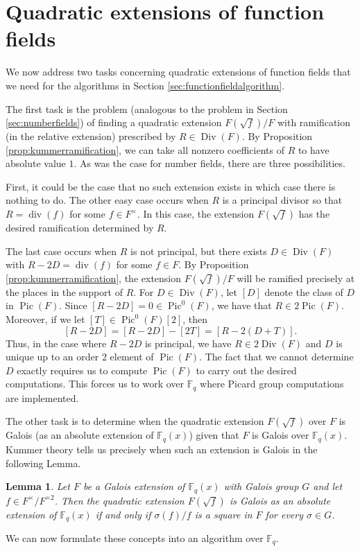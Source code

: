 \documentclass{dcthesis}
\newcommand{\FF}{\mathbb{F}}
\DeclareMathOperator{\Div}{Div}
\DeclareMathOperator{\Pic}{Pic}
\DeclareMathOperator{\ddiv}{div}
\numberwithin{equation}{section}
\newtheorem{lemma}[equation]{Lemma}
\theoremstyle{definition}
\theoremstyle{remark}
\begin{document}
{{  \section{Quadratic extensions of function fields}{
    \label{sec:functionfieldextensions}
    We now address two tasks concerning
    quadratic extensions of function fields
    that we need for the algorithms
    in Section \ref{sec:functionfieldalgorithm}.
    \par
    The first task is the problem
    (analogous to the problem in Section
    \ref{sec:numberfields})
    of
    finding a quadratic extension $F(\sqrt{f})/F$
    with ramification
    (in the relative extension)
    prescribed by
    $R\in\Div(F)$.
    By Proposition
    \ref{prop:kummerramification},
    we can take all nonzero coefficients
    of $R$ to have absolute value $1$.
    As was the case for number fields,
    there are three possibilities.
    \par
    First, it could be the case that no such
    extension exists in which case
    there is nothing to do.
    The other easy case occurs when $R$ is
    a principal divisor so that
    $R = \ddiv(f)$ for some $f\in F^\times$.
    In this case, the extension
    $F(\sqrt{f})$ has the desired ramification
    determined by $R$.
    \par
    The last case occurs when $R$
    is not principal, but there exists
    $D\in\Div(F)$ with $R-2D=\ddiv(f)$
    for some $f\in F$.
    By
    Proposition \ref{prop:kummerramification},
    the extension $F(\sqrt{f})/F$
    will be ramified precisely at the
    places in the
    support of
    $R$.
    For $D\in\Div(F)$,
    let $[D]$ denote the class of $D$
    in $\Pic(F)$.
    Since $[R-2D]=0\in\Pic^0(F)$,
    we have that $R\in 2\Pic(F)$.
    Moreover,
    if we let $[T]\in\Pic^0(F)[2]$,
    then
    \begin{equation}
      \label{eqn:twotorsionpoint}
      [R-2D] = [R-2D]-[2T] = [R-2(D+T)].
    \end{equation}
    Thus,
    in the case where $R-2D$ is principal,
    we have $R\in 2\Div(F)$
    and $D$ is unique up to an order $2$
    element of $\Pic(F)$.
    The fact that we cannot determine $D$
    exactly requires us to compute
    $\Pic(F)$ to carry out the desired
    computations.
    This forces us to work over $\FF_q$
    where Picard group computations
    are implemented.
    \par
    The other task is to determine
    when the quadratic extension
    $F(\sqrt{f})$ over $F$ is Galois
    (as an absolute extension of $\FF_q(x)$)
    given that $F$ is Galois
    over $\FF_q(x)$.
    Kummer theory tells us precisely when
    such an extension is Galois in the following
    Lemma.
    \begin{lemma}
      \label{lem:isgalois}
      Let $F$ be a Galois extension of
      $\FF_q(x)$
      with Galois group $G$ and
      let $f\in F^\times/F^{\times 2}$.
      Then the quadratic extension
      $F(\sqrt{f})$ is Galois
      as an absolute extension of
      $\FF_q(x)$ if and only if
      $\sigma(f)/f$ is a square
      in $F$
      for every $\sigma\in G$.
    \end{lemma}
    We can now formulate these concepts
    into an algorithm over $\FF_q$.
  }
}}
\end{document}
